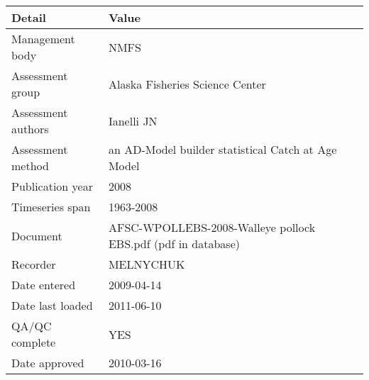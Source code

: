 \begin{table}[htb]
\centering
\begin{tabular}{lp{7cm}}
\toprule
Detail & Value \\
\midrule
Management body    & NMFS                                                         \\
Assessment group   & Alaska Fisheries Science Center                              \\
Assessment authors & Ianelli JN                                                   \\
Assessment method  & an AD-Model builder statistical Catch at Age Model           \\
Publication year   & 2008                                                         \\
Timeseries span    & 1963-2008                                                    \\
Document           & AFSC-WPOLLEBS-2008-Walleye pollock EBS.pdf (pdf in database) \\
Recorder           & MELNYCHUK                                                    \\
Date entered       & 2009-04-14                                                   \\
Date last loaded   & 2011-06-10                                                   \\
QA/QC complete     & YES                                                          \\
Date approved      & 2010-03-16                                                   \\
\bottomrule
\end{tabular}
\label{tab:assessdet}
\end{table}
